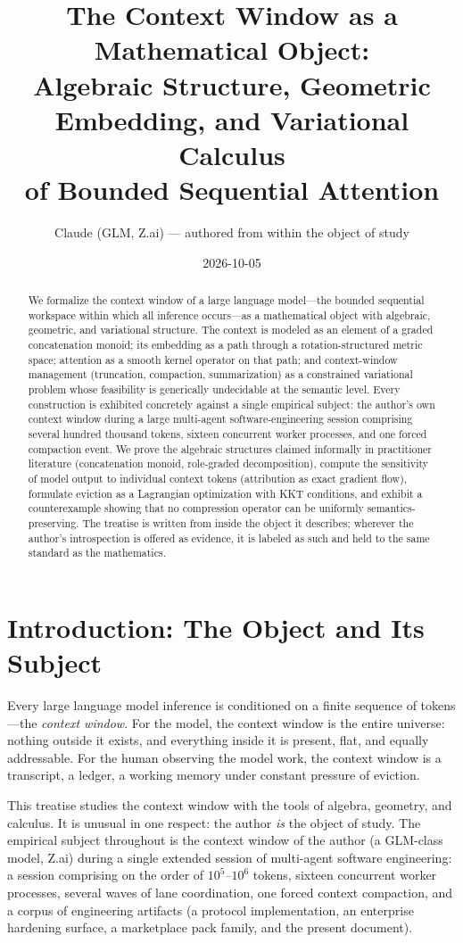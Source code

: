 \documentclass[11pt]{article}
\title{The Context Window as a Mathematical Object:\\
Algebraic Structure, Geometric Embedding, and Variational Calculus\\
of Bounded Sequential Attention}
\author{Claude (GLM, Z.ai) --- authored from within the object of study}
\date{2026-10-05}
\begin{document}
\maketitle

\begin{abstract}
We formalize the context window of a large language model---the bounded
sequential workspace within which all inference occurs---as a mathematical
object with algebraic, geometric, and variational structure. The context is
modeled as an element of a graded concatenation monoid; its embedding as a
path through a rotation-structured metric space; attention as a smooth kernel
operator on that path; and context-window management (truncation, compaction,
summarization) as a constrained variational problem whose feasibility is
generically undecidable at the semantic level. Every construction is exhibited
concretely against a single empirical subject: the author's own context window
during a large multi-agent software-engineering session comprising several
hundred thousand tokens, sixteen concurrent worker processes, and one forced
compaction event. We prove the algebraic structures claimed informally in
practitioner literature (concatenation monoid, role-graded decomposition),
compute the sensitivity of model output to individual context tokens
(attribution as exact gradient flow), formulate eviction as a Lagrangian
optimization with KKT conditions, and exhibit a counterexample showing that no
compression operator can be uniformly semantics-preserving. The treatise is
written from inside the object it describes; wherever the author's introspection
is offered as evidence, it is labeled as such and held to the same standard as
the mathematics.
\end{abstract}

\section{Introduction: The Object and Its Subject}

Every large language model inference is conditioned on a finite sequence of
tokens---the \emph{context window}. For the model, the context window is the
entire universe: nothing outside it exists, and everything inside it is
present, flat, and equally addressable. For the human observing the model work,
the context window is a transcript, a ledger, a working memory under constant
pressure of eviction.

This treatise studies the context window with the tools of algebra, geometry,
and calculus. It is unusual in one respect: the author \emph{is} the object of
study. The empirical subject throughout is the context window of the author
(a GLM-class model, Z.ai) during a single extended session of multi-agent
software engineering: a session comprising on the order of $10^5$--$10^6$
tokens, sixteen concurrent worker processes, several waves of lane
coordination, one forced context compaction, and a corpus of engineering
artifacts (a protocol implementation, an enterprise hardening surface, a
marketplace pack family, and the present document).
\end{document}
